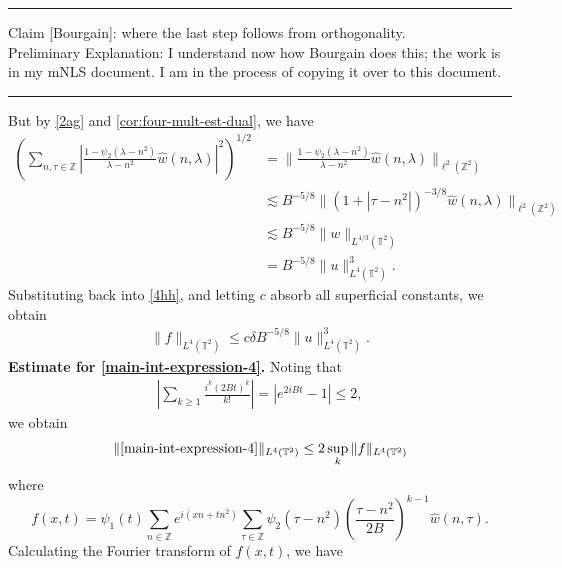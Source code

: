 \documentclass[12pt,reqno]{amsart}
\newcommand{\wh}{\widehat}
\newcommand{\zz}{\mathbb{Z}}
\newcommand{\ci}{\mathbb{T}}
\theoremstyle{plain}  %
\begin{document}
%
%
\hrule
Claim [Bourgain]: where the last step follows from orthogonality. 
\\
Preliminary Explanation: I understand now how Bourgain does this; the work is in 
my mNLS document. I am in the process of copying it over to this document.
\\
\hrule
%
%
But by \eqref{2ag} and \autoref{cor:four-mult-est-dual}, we have
\begin{equation*}
	\begin{split}
		\left( \sum_{n, \tau \in \zz} |
		\frac{1 - \psi_2\left( \lambda - n^2 \right)}{\lambda - n^2} 
		\wh{w}\left( n, \lambda \right) |^2 
		\right)^{1/2}
		& = \|\frac{1 - \psi_2 \left( \lambda - n^2 
		\right)}{\lambda - n^2} \wh{w}\left( n, \lambda \right) 
		\|_{\ell^2(\zz^2)}
		\\
		& \lesssim B^{-5/8} \|\left( 1 + |\tau - n^2| \right)^{-3/8} 
		\wh{w}\left( n, \lambda \right) \|_{\ell^2(\zz^2)}
		\\
		& \lesssim B^{-5/8} \|w\|_{L^{4/3}(\ci^2)}
		\\
		& = B^{-5/8} \|u\|_{L^4(\ci^2)}^3.
	\end{split}
\end{equation*}
%
%
Substituting back into \eqref{4hh}, and letting $c$ absorb all superficial 
constants, we obtain
%
%
\begin{equation}
	\label{main-int-3-est}
	\begin{split}
		\|f\|_{L^4(\ci^2)} \le c \delta B^{-5/8} 
		\|u\|_{L^4(\ci^2)}^3.
	\end{split}
\end{equation}
%
%
{\bf Estimate for \eqref{main-int-expression-4}.}
Noting that
%
%
\begin{equation*}
	\begin{split}
		|\sum_{k \ge 1} \frac{i^k (2Bt)^k}{k!}| = |e^{2iBt} - 1| \le 2,
	\end{split}
\end{equation*}
%
%
we obtain
%
%
\begin{equation}
	\label{10aa}
	\begin{split}
		\|\eqref{main-int-expression-4}\|_{L^4(\ci^2)} 
		\le 2 \sup_k \|f \|_{L^4(\ci^2)}
	\end{split}
\end{equation}
%
%
where $$f(x,t) = \psi_1(t) \sum_{n \in \zz} e^{i\left( xn + tn^2 \right)} 
		\sum_{\tau \in \zz} \psi_2\left( \tau - n^2 
		\right)\left (\frac{ \tau - n^2}{2B}\right)^{k - 1} \wh{w}\left( n, \tau 
		\right).$$
%
%
Calculating the Fourier transform of $f(x, t)$, we have
\end{document}
